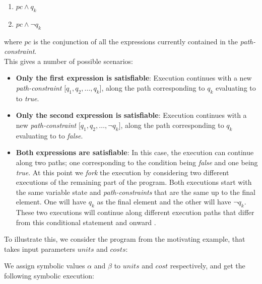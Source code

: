 		\begin{enumerate}
			\item $ pc \land q_k$
			\item $ pc \land \neg q_k$
		\end{enumerate}	
		where $pc$ is the conjunction of all the expressions currently contained in the \emph{path-constraint}.
		\\
		This gives a number of possible scenarios:	
		\begin{itemize}
			\item \textbf{Only the first expression is satisfiable}: Execution continues with a new \emph{path-constraint} $\lbrack q_1, q_2, \ldots, q_k \rbrack$, along the path corresponding to $q_k$ evaluating to to \emph{true}.
			\item \textbf{Only the second expression is satisfiable}:  Execution continues with a new \emph{path-constraint} $\lbrack q_1, q_2, \ldots, \neg q_k \rbrack$, along the path corresponding to $q_k$ evaluating to to \emph{false}.
			
			\item \textbf{Both expressions are satisfiable}: In this case, the execution can continue along two paths; one corresponding to the condition being \emph{false} and one being \emph{true}. At this point we \emph{fork} the execution by considering two different executions of the remaining part of the program. Both executions start with the same variable state and \emph{path-constraints} that are the same
			 up to the final element. One will have $q_k$ as the final element and the other will have $\neg q_k$. 
			These two executions will continue along different execution paths that differ from this conditional statement and onward \cite{King76}.
		\end{itemize} 
		
		To illustrate this, we consider the program from the motivating example, that takes input parameters $units$ and $costs$:
		
		\motexample{}
		\newpage
		We assign symbolic values $\alpha$ and $\beta$ to $units$ and $cost$ respectively, and get the following symbolic execution:
		
